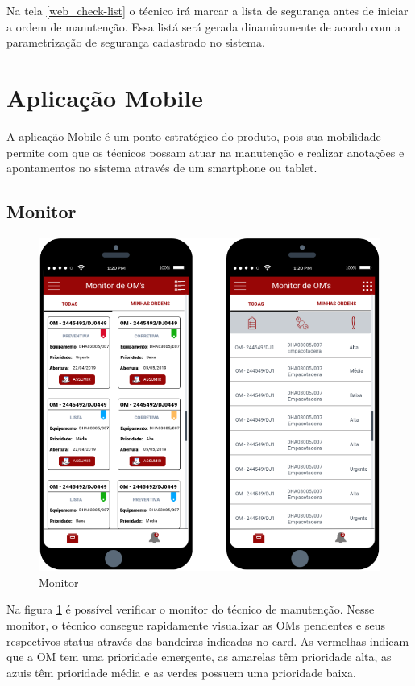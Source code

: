 Na tela \ref{web_check-list} o técnico irá marcar a lista de segurança antes de iniciar a ordem de manutenção. Essa listá será gerada dinamicamente de acordo com a parametrização de segurança cadastrado no sistema.

\section{Aplicação Mobile}
A aplicação Mobile é um ponto estratégico do produto, pois sua mobilidade permite com que os técnicos possam atuar na manutenção e realizar anotações e apontamentos no sistema através de um smartphone ou tablet.

\subsection{Monitor}

\begin{figure}[H]
	\caption{\label{mobile_monitor}Monitor}
	\begin{center}
		\includegraphics[scale=0.75]{./Figuras/mobile/monitor.png}
	\end{center}
\end{figure}

Na figura \ref{mobile_monitor} é possível verificar o monitor do técnico de manutenção. Nesse monitor, o técnico consegue rapidamente visualizar as OMs pendentes e seus respectivos status através das bandeiras indicadas no card. As  vermelhas indicam que a OM tem uma prioridade emergente, as amarelas têm prioridade alta, as azuis têm prioridade média e as verdes possuem uma prioridade baixa.

